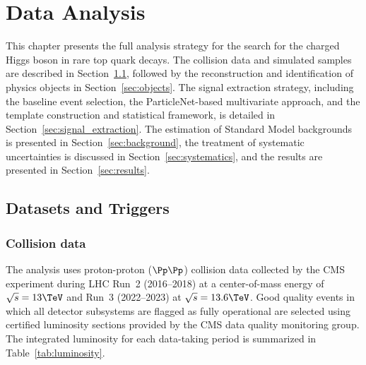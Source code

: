 \chapter{Data Analysis}
\label{ch:analysis}

This chapter presents the full analysis strategy for the search for the charged Higgs boson in rare top quark decays. The collision data and simulated samples are described in Section~\ref{sec:datasets}, followed by the reconstruction and identification of physics objects in Section~\ref{sec:objects}. The signal extraction strategy, including the baseline event selection, the ParticleNet-based multivariate approach, and the template construction and statistical framework, is detailed in Section~\ref{sec:signal_extraction}. The estimation of Standard Model backgrounds is presented in Section~\ref{sec:background}, the treatment of systematic uncertainties is discussed in Section~\ref{sec:systematics}, and the results are presented in Section~\ref{sec:results}.

\section{Datasets and Triggers}
\label{sec:datasets}

\subsection{Collision data}
\label{ssec:collision_data}

The analysis uses proton-proton ($\Pp\Pp$) collision data collected by the CMS experiment during LHC Run~2 (2016--2018) at a center-of-mass energy of $\sqrt{s} = 13\TeV$ and Run~3 (2022--2023) at $\sqrt{s} = 13.6\TeV$. Good quality events in which all detector subsystems are flagged as fully operational are selected using certified luminosity sections provided by the CMS data quality monitoring group. The integrated luminosity for each data-taking period is summarized in Table~\ref{tab:luminosity}.

